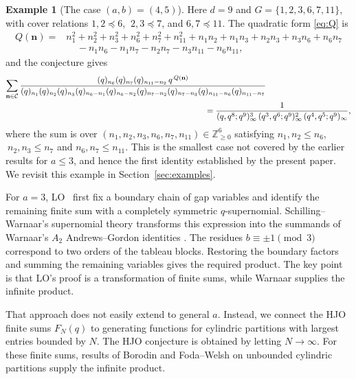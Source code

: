 \documentclass[12pt,reqno]{amsart}
\numberwithin{equation}{section}
\theoremstyle{definition}
\newtheorem*{example}{Example}
\theoremstyle{remark}
\theoremstyle{plain}
\newcommand{\NN}{\mathbb Z_{\ge0}}
\newcommand{\nn}{\mathbf n}
\begin{document}
\begin{example}[The case $(a,b)=(4,5)$]\label{ex:45}
Here $d=9$ and $G=\{1,2,3,6,7,11\}$, with cover relations $1,2\preceq6$, $\ 2,3\preceq7$, and $6,7\preceq11$. The quadratic form \eqref{eq:Q} is
\[
\begin{aligned}
 Q(\nn)={}&n_1^2+n_2^2+n_3^2+n_6^2+n_7^2+n_{11}^2
+n_1n_2+n_1n_3+n_2n_3+n_3n_6+n_6n_7\\
 &\ \ \ \ \ -n_1n_6-n_1n_7-n_2n_7-n_3n_{11}-n_6n_{11},
\end{aligned}
\]
and the conjecture gives
\begin{displaymath}
\begin{split}
 \sum_{\nn\in\mathcal C}
 \frac{(q)_{n_6}(q)_{n_7}(q)_{n_{11}-n_2}\,q^{\,Q(\nn)}}
      {(q)_{n_1}(q)_{n_2}(q)_{n_3}
       (q)_{n_6-n_1}(q)_{n_6-n_2}(q)_{n_7-n_2}(q)_{n_7-n_3}
       (q)_{n_{11}-n_6}(q)_{n_{11}-n_7}}\hspace{3.5cm}&\\
 =\frac{1}{(q,q^{8};q^{9})_\infty^{3}\,(q^{3},q^{6};q^{9})_\infty^{2}\,(q^{4},q^{5};q^{9})_\infty}&,
\end{split}
\end{displaymath}
where the sum is over $(n_1,n_2,n_3,n_6,n_7,n_{11})\in\NN^6$ satisfying $n_1,n_2\le n_6$, $\ n_2,n_3\le n_7$ and $n_6,n_7\le n_{11}$. This is the smallest case not covered by the earlier results for $a\le3$, and hence the first identity established by the present paper. We revisit this example in Section~\ref{sec:examples}.
\end{example}


For $a=3$, LO~\cite{LO} first fix a boundary chain of gap
variables and identify the remaining finite sum with a completely
symmetric $q$-supernomial.  Schilling--Warnaar's supernomial theory
\cite{SW,Schilling} transforms this expression into the summands of
Warnaar's $A_2$ Andrews--Gordon identities
\cite[(1.10)--(1.11)]{Warnaar}.  The residues $b\equiv\pm1\pmod3$
correspond to two orders of the tableau blocks.  Restoring the boundary
factors and summing the remaining variables gives the required product. The key point is that LO's proof is a transformation of finite sums, while Warnaar \cite[(1.10)--(1.11)]{Warnaar} supplies the infinite product.


That approach does not easily extend to general $a$. Instead, we connect the HJO finite sums $F_N(q)$ to generating functions
for cylindric partitions with largest entries bounded by $N$. The HJO conjecture is obtained by letting $N\to \infty$. For these finite sums, results of Borodin \cite{Borodin} and Foda--Welsh \cite{FW} on unbounded cylindric partitions supply the infinite product. 
\end{document}
